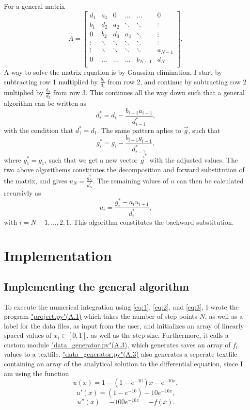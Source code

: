 \documentclass[english,notitlepage,reprint]{revtex4-1}  %
\begin{document}
For a general matrix
$$
	A =
	\begin{bmatrix}
	d_{1} & a_{1} & 0 & \dots & \dots & 0 \\
	b_{1} & d_{2} & a_{2} & \ddots & \ddots &\vdots \\
	0 & b_{2} & d_{3} & a_{3} & \ddots & \vdots \\
	\vdots & \ddots & \ddots & \ddots & \ddots & \vdots \\
	\vdots & \ddots & \ddots & \ddots & \ddots & a_{N-1} \\
	0 & \dots &\dots & \dots & b_{N-1} & d_{N} \\
	\end{bmatrix},
$$
A way to solve the matrix equation is by Gaussian elimination. I start by subtracting row 1 multiplied by \(\frac{b_{1}}{d_{1}}\) from row 2, and continue by subtracting row 2 multiplied by \(\frac{b_{2}}{d_{2}}\) from row 3. This continues all the way down such that a general algorithm can be written as
\begin{equation}
	d_{i}^{*}=d_{i}-\frac{b_{i-1}a_{i-1}}{d_{i-1}^{*}}, \label{eq:1}
\end{equation}
with the condition that \(d^{*}_{1}=d_{1}\). The same pattern aplies to \(\vec{g}\), such that
\begin{equation}
	g_{i}^{*} = g_{i}-\frac{b_{i-1}g_{i-1}}{d_{i-1}^{*}}, \label{eq:2}
\end{equation}
where \(g_{1}^{*} = g_{1}\), such that we get a new vector \(\vec{g}^{*}\) with the adjusted values. The two above algorithems constitutes the decomposition and forward substitution of the matrix, and gives \(u_{N}=\frac{g_{N}^{*}}{d_{N}^{*}}\). The remaining values of \(u\) can then be calculated recursivly as
\begin{equation}
		u_{i} = \frac{g_{i}^{*}-a_{i}u_{i+1}}{d_{i}^{*}}, \label{eq:3}
\end{equation}
with \(i = N-1,...,2,1\). This algorithm constitutes the backward substitution.

\section{Implementation}\label{sec:3}

\subsection{Implementing the general algorithm}\label{subsec:31}
To execute the numerical integration using \eqref{eq:1}, \eqref{eq:2}, and \eqref{eq:3}, I wrote the program \hyperref[A:1]{"project.py"(A.1)} which takes the number of step points \(N\), as well as a label for the data files, as input from the user, and initializes an array of linearly spaced values of \(x_{i}\in[0,1]\), as well as the step-size. Furthermore, it calls a custom module \hyperref[A:3]{"data\_generator.py"(A.3)}, which generates saves an array of \(f_{i}\) values to a textfile. \hyperref[A:3]{"data\_generator.py"(A.3)} also generates a seperate textfile containing an array of the analytical solution to the differential equation, since I am using the function
$$
	u(x) = 1-(1-e^{-10})x-e^{-10x},
$$
$$
	u'(x) = (1-e^{-10})-10e^{-10x},
$$
$$
	u''(x) = -100e^{-10x}=-f(x).
$$
\end{document}
